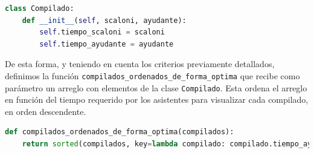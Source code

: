 \begin{lstlisting}[language=Python]
class Compilado:
    def __init__(self, scaloni, ayudante):
        self.tiempo_scaloni = scaloni
        self.tiempo_ayudante = ayudante
\end{lstlisting}

De esta forma, y teniendo en cuenta los criterios previamente detallados, definimos la función
\texttt{compilados\_ordenados\_de\_forma\_optima} que recibe como parámetro un arreglo con
elementos de la clase \texttt{Compilado}. Esta ordena el arreglo en función del tiempo requerido
por los asistentes para visualizar cada compilado, en orden descendente. 

\begin{lstlisting}[language=Python]
def compilados_ordenados_de_forma_optima(compilados):
    return sorted(compilados, key=lambda compilado: compilado.tiempo_ayudante, reverse=True)
\end{lstlisting}

